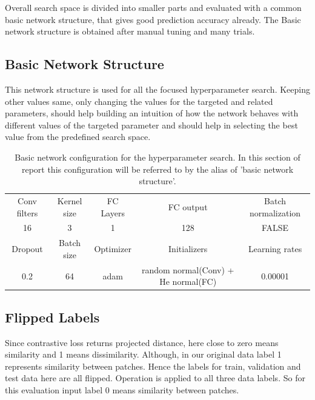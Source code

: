Overall search space is divided into smaller parts and evaluated with a common basic network structure, that gives good prediction accuracy already. The Basic network structure is obtained after manual tuning and many trials.

\subsection{Basic Network Structure}
This network structure is used for all the focused hyperparameter search. Keeping other values same, only changing the values for the targeted and related parameters, should help building an intuition of how the network behaves 
with different values of the targeted parameter and should help in selecting the best value from the predefined search space.

\begin{table}
 \centering
\caption{Basic network configuration for the hyperparameter search. In this section of report this configuration will be referred to by the alias of 'basic network structure'.}
\resizebox{\textwidth}{!}
{\begin{tabular}{|c | c| c| c| c|} 
\hline\hline
 \rowcolor{lightgrey}
 Conv filters & Kernel size & FC Layers & FC output & Batch normalization \\ 
  16 & 3 & 1 & 128 & FALSE\\ 
 \hline
 \rowcolor{lightgrey}
 Dropout & Batch size & Optimizer & Initializers & Learning rates\\[0.5ex]
 \hline
 0.2 & 64 & adam & random normal(Conv) + He normal(FC) & 0.00001\\[0.5ex]
 \hline \hline
\end{tabular}}
\label{table:basic_vgg_network}
\end{table}

\subsection{Flipped Labels}
Since contrastive loss returns projected distance, here close to zero means similarity and 1 means dissimilarity. Although, in our original data label 1 represents similarity between patches.
Hence the labels for train, validation and test data here are all flipped. Operation  is applied to all three data labels. So for this evaluation input label 0 means similarity between patches.

